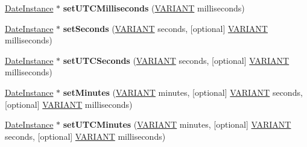 \begin{DoxyCompactItemize}
\item 
\mbox{\label{interface_j_s_global_1_1_date_instance_ac2fa9c262c019810ab36525afbf645a9}} 
\hyperlink{interface_j_s_global_1_1_date_instance}{Date\+Instance} $\ast$ {\bfseries set\+U\+T\+C\+Milliseconds} (\hyperlink{structtag_v_a_r_i_a_n_t}{V\+A\+R\+I\+A\+NT} milliseconds)
\item 
\mbox{\label{interface_j_s_global_1_1_date_instance_a1787d51c65561e82f306940cfc758823}} 
\hyperlink{interface_j_s_global_1_1_date_instance}{Date\+Instance} $\ast$ {\bfseries set\+Seconds} (\hyperlink{structtag_v_a_r_i_a_n_t}{V\+A\+R\+I\+A\+NT} seconds, \mbox{[}optional\mbox{]} \hyperlink{structtag_v_a_r_i_a_n_t}{V\+A\+R\+I\+A\+NT} milliseconds)
\item 
\mbox{\label{interface_j_s_global_1_1_date_instance_a110e2cdda0ad188374f49865b2bf1a20}} 
\hyperlink{interface_j_s_global_1_1_date_instance}{Date\+Instance} $\ast$ {\bfseries set\+U\+T\+C\+Seconds} (\hyperlink{structtag_v_a_r_i_a_n_t}{V\+A\+R\+I\+A\+NT} seconds, \mbox{[}optional\mbox{]} \hyperlink{structtag_v_a_r_i_a_n_t}{V\+A\+R\+I\+A\+NT} milliseconds)
\item 
\mbox{\label{interface_j_s_global_1_1_date_instance_a40741052e1827056b78a57a348c20a22}} 
\hyperlink{interface_j_s_global_1_1_date_instance}{Date\+Instance} $\ast$ {\bfseries set\+Minutes} (\hyperlink{structtag_v_a_r_i_a_n_t}{V\+A\+R\+I\+A\+NT} minutes, \mbox{[}optional\mbox{]} \hyperlink{structtag_v_a_r_i_a_n_t}{V\+A\+R\+I\+A\+NT} seconds, \mbox{[}optional\mbox{]} \hyperlink{structtag_v_a_r_i_a_n_t}{V\+A\+R\+I\+A\+NT} milliseconds)
\item 
\mbox{\label{interface_j_s_global_1_1_date_instance_a57d061945053be71bea97c5880c463fd}} 
\hyperlink{interface_j_s_global_1_1_date_instance}{Date\+Instance} $\ast$ {\bfseries set\+U\+T\+C\+Minutes} (\hyperlink{structtag_v_a_r_i_a_n_t}{V\+A\+R\+I\+A\+NT} minutes, \mbox{[}optional\mbox{]} \hyperlink{structtag_v_a_r_i_a_n_t}{V\+A\+R\+I\+A\+NT} seconds, \mbox{[}optional\mbox{]} \hyperlink{structtag_v_a_r_i_a_n_t}{V\+A\+R\+I\+A\+NT} milliseconds)
\item 
\mbox{\label{interface_j_s_global_1_1_date_instance_a91046149fc1b6736264df76a5e39554d}} 

\end{DoxyCompactItemize}
